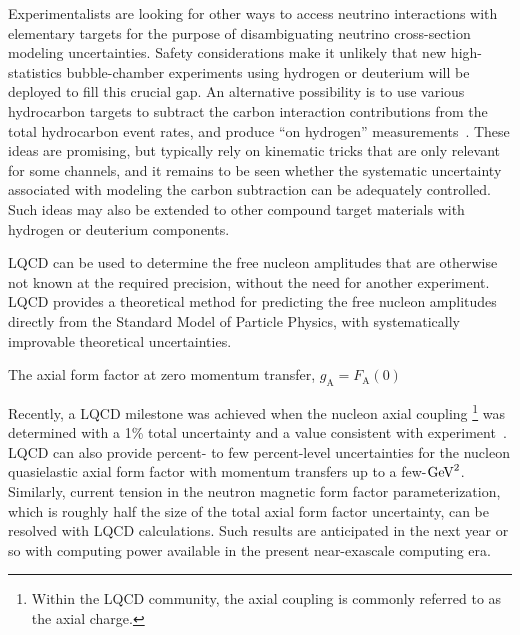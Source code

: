 \documentclass{ar-1col}
\begin{document}
Experimentalists are looking for other ways to access neutrino interactions
with elementary targets for the purpose of disambiguating neutrino cross-section
modeling uncertainties.
Safety considerations make it unlikely that new high-statistics bubble-chamber experiments using
hydrogen or deuterium will be deployed to fill this crucial gap.
An alternative possibility is to use various hydrocarbon targets to subtract the carbon interaction contributions from
the total hydrocarbon event rates, and produce ``on hydrogen'' measurements~\cite{PhysRevD.92.051302, PhysRevD.101.092003, Hamacher-Baumann:2020ogq, DUNE:2021tad, Cai:2021vkc}.
These ideas are promising, but typically rely on kinematic tricks that are only relevant for some channels, and it remains to be seen whether the systematic uncertainty associated with modeling the carbon subtraction can be adequately controlled. Such ideas may also be extended to other compound target materials with hydrogen or deuterium components.

LQCD can be used to determine the free nucleon amplitudes that are otherwise not known at the required precision, without the need for another experiment.
LQCD provides a theoretical method for predicting the free nucleon amplitudes directly from the Standard Model of Particle Physics, with systematically improvable theoretical uncertainties.%
\begin{marginnote}
 {The axial form factor at zero momentum transfer, $g_{\mathrm{A}} = F_{\mathrm{A}}(0)$}
\end{marginnote}%
Recently, a LQCD milestone was achieved when the nucleon axial coupling%
\footnote{Within the LQCD community, the axial coupling
 is commonly referred to as the axial charge.}
was determined with a 1\% total uncertainty and a value consistent with experiment~\cite{Chang:2018uxx}.
LQCD can also provide percent- to few percent-level uncertainties for the nucleon quasielastic axial form factor with momentum transfers up to a few-${\rm GeV}^2$.
Similarly, current tension in the neutron magnetic form factor parameterization, which is roughly half the size of the total axial form factor uncertainty, can be resolved with LQCD calculations.
Such results are anticipated in the next year or so with computing power available in the present near-exascale computing era.
\end{document}
